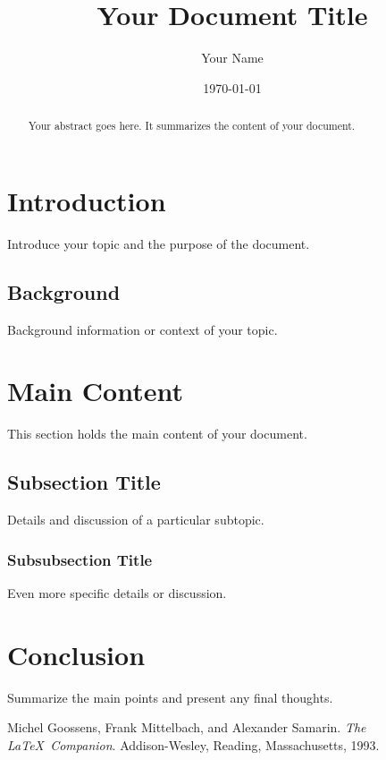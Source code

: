 \documentclass[12pt]{article}
\title{Your Document Title}
\author{Your Name}
\date{\today} %
\begin{document}
\maketitle

\begin{abstract}
Your abstract goes here. It summarizes the content of your document.
\end{abstract}

\section{Introduction}
Introduce your topic and the purpose of the document.

\subsection{Background}
Background information or context of your topic.

\section{Main Content}
This section holds the main content of your document.

\subsection{Subsection Title}
Details and discussion of a particular subtopic.

\subsubsection{Subsubsection Title}
Even more specific details or discussion.

\section{Conclusion}
Summarize the main points and present any final thoughts.

\begin{thebibliography}{9}
Michel Goossens, Frank Mittelbach, and Alexander Samarin. 
\textit{The \LaTeX\ Companion}. 
Addison-Wesley, Reading, Massachusetts, 1993.


\end{thebibliography}
\end{document}
